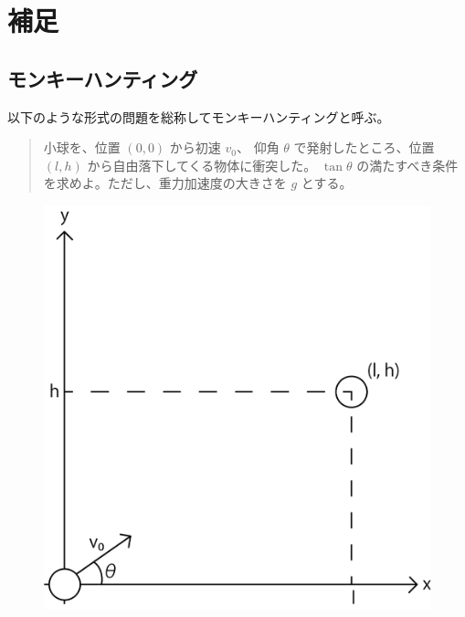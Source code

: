\chapter{補足}

\section{モンキーハンティング} \label{モンキーハンティング}

以下のような形式の問題を総称してモンキーハンティングと呼ぶ。

\begin{quote}
小球を、位置 $(0, 0)$ から初速 $v_0$、 仰角 $\theta$ で発射したところ、位置 $(l, h)$ から自由落下してくる物体に衝突した。 $\tan \theta$ の満たすべき条件を求めよ。ただし、重力加速度の大きさを $g$ とする。
\end{quote}

\begin{figure}[htb]
\centering
\includegraphics{work/monkey_hunting.png}
\end{figure}
